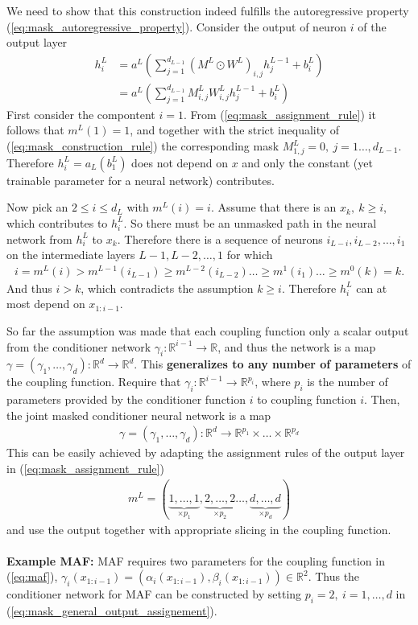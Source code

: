 \documentclass[12pt,a4paper]{article}
\begin{document}
We need to show that this construction indeed fulfills the autoregressive property (\ref{eq:mask_autoregressive_property}).
Consider the output of neuron $i$ of the output layer
\begin{align}
	h^L_i &= a^L\left(\sum_{j=1}^{d_{L-1}}(M^L\odot W^L)_{i,j} h^{L-1}_j + b^L_i\right) \nonumber \\ 
		 &=a^L\left(\sum_{j=1}^{d_{L-1}}M_{i,j} ^L W^L_{i,j} h^{L-1}_j + b^L_i\right) 
\end{align}
First consider the compontent $i=1$. From (\ref{eq:mask_assignment_rule}) it follows that $m^L(1) = 1$, and together with the strict inequality of (\ref{eq:mask_construction_rule}) the corresponding mask $M^L_{1, j} = 0, ~ j=1\dots, d_{L-1}$. Therefore $h^L_i = a_L(b^L_1)$ does not depend on $x$ and only the constant (yet trainable parameter for a neural network) contributes. 

Now pick an $2\leq i \leq d_L$ with $m^L(i)=i$. Assume that there is an $x_k, ~k \geq i$, which contributes to $h^L_i$. So there must be an unmasked path in the neural network from $h^L_i$ to $x_k$. Therefore there is a sequence of neurons 
$i_{L-i}, i_{L-2}, \dots,  i_1$ on the intermediate layers $L-1, L-2, \dots, 1$ for which
\begin{align}
i = m^L(i) > m^{L-1}(i_{L-1}) \geq m^{L-2}(i_{L-2}) \dots \geq m^{1}(i_{1}) \dots \geq m^{0}(k) = k. \nonumber
\end{align}
And thus $i>k$, which contradicts the assumption $k\geq i$. Therefore $h^L_i$ can at most depend on $x_{1:i-1}$.

So far the assumption was made that each coupling function only a scalar output from the conditioner network  $\gamma_i:  \mathbb{R}^{i-1} \rightarrow \mathbb{R}$, and thus the network is a map $\gamma = (\gamma_1, \dots,\gamma_d):  \mathbb{R}^{d} \rightarrow \mathbb{R}^d$. This \textbf{generalizes to any number of parameters }of the coupling function. Require that  $\gamma_i:  \mathbb{R}^{i-1} \rightarrow \mathbb{R}^{p_i}$, where $p_i$ is the number of parameters provided by the conditioner function $i$ to coupling function $i$. Then, the joint masked conditioner neural network is a map
\begin{align}
	\gamma = (\gamma_1, \dots,\gamma_d):  \mathbb{R}^{d} \rightarrow \mathbb{R}^{p_1} \times \dots \times \mathbb{R}^{p_d} 
\end{align}
This can be easily achieved by adapting the assignment rules of the output layer in (\ref{eq:mask_assignment_rule})
\begin{align}\label{eq:mask_general_output_assignement}
	m^L = (\underbrace{1,\dots, 1}_{\times p_1},  \underbrace{2,\dots, 2}_{\times p_2} \dots, \underbrace{d, \dots, d}_{\times p_d})
\end{align}
and use the output together with appropriate slicing in the coupling function.
\\
\\
\textbf{Example MAF:}  MAF requires two parameters for the coupling function in (\ref{eq:maf}), $\gamma_i(x_{1:i-1}) = (\alpha_i(x_{1:i-1}), \beta_i(x_{1:i-1}))\in \mathbb{R}^2$. Thus the conditioner network for MAF can be constructed by setting $p_i=2, ~i=1,\dots, d$ in  (\ref{eq:mask_general_output_assignement}).
\end{document}
